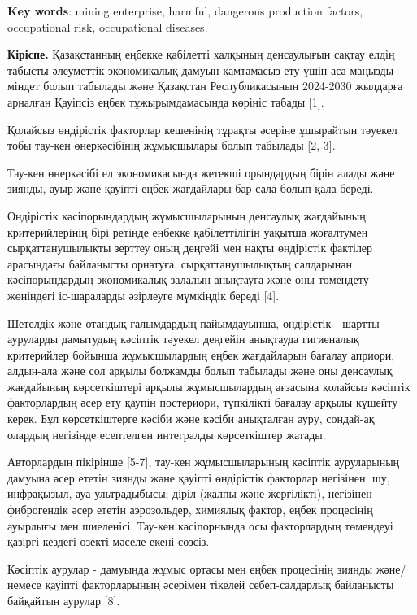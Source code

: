 {\bfseries Key words}: mining enterprise, harmful, dangerous production
factors, occupational risk, occupational diseases.

\begin{multicols}{2}
{\bfseries Кіріспе.} Қазақстанның еңбекке қабілетті халқының денсаулығын
сақтау елдің табысты әлеуметтік-экономикалық дамуын қамтамасыз ету үшін
аса маңызды міндет болып табылады және Қазақстан Республикасының
2024-2030 жылдарға арналған Қауіпсіз еңбек тұжырымдамасында көрініс
табады {[}1{]}.

Қолайсыз өндірістік факторлар кешенінің тұрақты әсеріне ұшырайтын
тәуекел тобы тау-кен өнеркәсібінің жұмысшылары болып табылады {[}2,
3{]}.

Тау-кен өнеркәсібі ел экономикасында жетекші орындардың бірін алады және
зиянды, ауыр және қауіпті еңбек жағдайлары бар сала болып қала береді.

Өндірістік кәсіпорындардың жұмысшыларының денсаулық жағдайының
критерийлерінің бірі ретінде еңбекке қабілеттілігін уақытша жоғалтумен
сырқаттанушылықты зерттеу оның деңгейі мен нақты өндірістік фактілер
арасындағы байланысты орнатуға, сырқаттанушылықтың салдарынан
кәсіпорындардың экономикалық залалын анықтауға және оны төмендету
жөніндегі іс-шараларды әзірлеуге мүмкіндік береді {[}4{]}.

Шетелдік және отандық ғалымдардың пайымдауынша, өндірістік - шартты
ауруларды дамытудың кәсіптік тәуекел деңгейін анықтауда гигиеналық
критерийлер бойынша жұмысшылардың еңбек жағдайларын бағалау априори,
алдын-ала және сол арқылы болжамды болып табылады және оны денсаулық
жағдайының көрсеткіштері арқылы жұмысшылардың ағзасына қолайсыз кәсіптік
факторлардың әсер ету қаупін постериори, түпкілікті бағалау арқылы
күшейту керек. Бұл көрсеткіштерге кәсіби және кәсіби анықталған ауру,
сондай-ақ олардың негізінде есептелген интегралды көрсеткіштер жатады.

Авторлардың пікірінше {[}5-7{]}, тау-кен жұмысшыларының кәсіптік
ауруларының дамуына әсер ететін зиянды және қауіпті өндірістік факторлар
негізінен: шу, инфрақызыл, ауа ультрадыбысы; діріл (жалпы және
жергілікті), негізінен фиброгендік әсер ететін аэрозольдер, химиялық
фактор, еңбек процесінің ауырлығы мен шиеленісі. Тау-кен кәсіпорнында
осы факторлардың төмендеуі қазіргі кездегі өзекті мәселе екені сөзсіз.

Кәсіптік аурулар - дамуында жұмыс ортасы мен еңбек процесінің зиянды
және/немесе қауіпті факторларының әсерімен тікелей себеп-салдарлық
байланысты байқайтын аурулар {[}8{]}.


\end{multicols}
